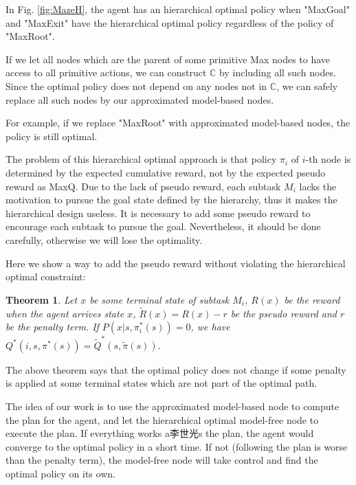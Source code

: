 \documentclass{article} %
\newtheorem{theorem}{Theorem}
\begin{document}
In Fig. \ref{fig:MazeH}, the agent has an hierarchical optimal policy when "MaxGoal" and "MaxExit"
have the hierarchical optimal policy regardless of the policy of "MaxRoot".

If we let all nodes which are the parent of some primitive Max nodes to have access
to all primitive actions, we can construct $\mathbb{C}$ by including all 
such nodes. Since the optimal policy does not depend on any nodes not in $\mathbb{C}$, 
we can safely replace all such nodes by our approximated model-based nodes.

For example, if we replace "MaxRoot" with approximated model-based nodes,
the policy is still optimal. 

The problem of this hierarchical optimal approach is that policy $\pi_i$ of $i$-th
node is determined by the expected cumulative reward, not by the expected pseudo reward as
MaxQ. Due to the lack of pseudo reward, each subtask $M_i$ lacks the motivation to 
pursue the goal state defined by the hierarchy, thus it makes the hierarchical 
design useless. 
It is necessary to add some pseudo reward to encourage each subtask to pursue 
the goal. Nevertheless, it should be done carefully, otherwise we will lose
the optimality.

Here we show a way to add the pseudo reward without violating the hierarchical 
optimal constraint:
\begin{theorem}
    Let $x$ be some terminal state of subtask $M_i$, $R(x)$ be the reward
    when the agent arrives state $x$, $\tilde{R}(x) = R(x) - r$ be the pseudo reward
    and $r$ be the penalty term.
    If $P(x| s, \pi_i^*(s)) = 0$, we have $Q^*(i, s, \pi^*(s)) = \tilde{Q}^*(s, \tilde{\pi}(s))$.
\end{theorem}

The above theorem says that the optimal policy does not change 
if some penalty is applied at some terminal states which are not part of the optimal path.




The idea of our work is to use the approximated model-based node to 
compute the plan for the agent, and let the hierarchical optimal model-free node
to execute the plan. If everything works a李世光s the plan, the agent would converge to the optimal
policy in a short time. If not (following the plan is worse than the penalty term),
the model-free node will take control and find the optimal policy on its own.
\end{document}
